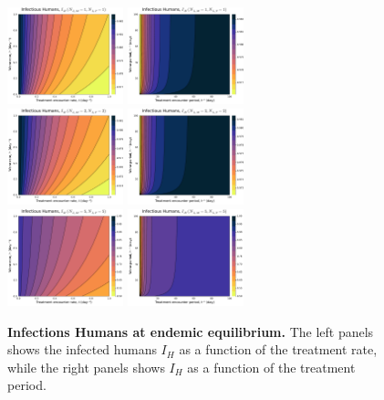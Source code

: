 \documentclass[12pt]{article}
\begin{document}
\begin{figure}[H]
    \centering
    \includegraphics[width=0.3\textwidth]{../../fig/gen_model/IH_rates_txh_1x1.pdf}
    \includegraphics[width=0.3\textwidth]{../../fig/gen_model/IH_periods_txh_1x1.pdf}\\
    \includegraphics[width=0.3\textwidth]{../../fig/gen_model/IH_rates_txh_2x2.pdf}
    \includegraphics[width=0.3\textwidth]{../../fig/gen_model/IH_periods_txh_2x2.pdf}\\
    \includegraphics[width=0.3\textwidth]{../../fig/gen_model/IH_rates_txh_5x5.pdf}
    \includegraphics[width=0.3\textwidth]{../../fig/gen_model/IH_periods_txh_5x5.pdf}
    \caption{\textbf{Infections Humans at endemic equilibrium.} The left panels shows the infected humans \(I_H\) as a function of the treatment rate, while the right panels shows \(I_H\) as a function of the treatment period.}
\end{figure}
\end{document}
